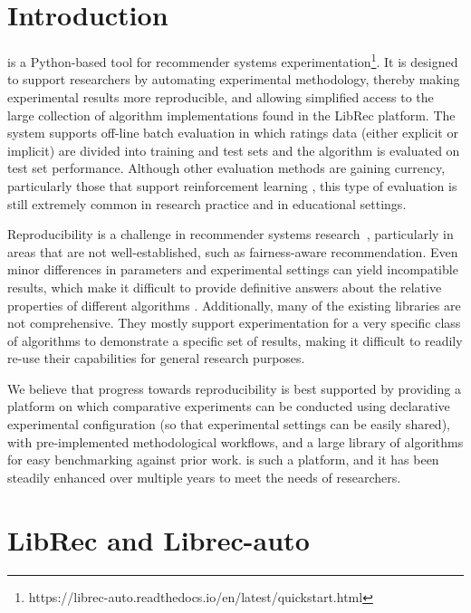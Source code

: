 \section{Introduction}
\label{sec:librec_intro}

\libauto{} is a Python-based tool for recommender systems experimentation\footnote{https://librec-auto.readthedocs.io/en/latest/quickstart.html}. It is designed to support researchers by automating experimental methodology, thereby making experimental results more reproducible, and allowing simplified access to the large collection of algorithm implementations found in the LibRec platform. The system supports off-line batch evaluation in which ratings data (either explicit or implicit) are divided into training and test sets and the algorithm is evaluated on test set performance. Although other evaluation methods are gaining currency, particularly those that support reinforcement learning \cite{joachims2018reveal,joachims2019reveal,joachims2020reveal}, this type of evaluation is still extremely common in research practice and in educational settings. 

Reproducibility is a challenge in recommender systems research~\cite{said2014comparative,beel2016towards,sun2020we}, particularly in areas that are not well-established, such as fairness-aware recommendation. Even minor differences in parameters and experimental settings can yield incompatible results, which make it difficult to provide definitive answers about the relative properties of different algorithms \cite{Said2015Replicable}. Additionally, many of the existing libraries are not comprehensive. They mostly support experimentation for a very specific class of algorithms to demonstrate a specific set of results, making it difficult to readily re-use their capabilities for general research purposes. 

We believe that progress towards reproducibility is best supported by providing a platform on which comparative experiments can be conducted using declarative experimental configuration (so that experimental settings can be easily shared), with pre-implemented methodological workflows, and a large library of algorithms for easy benchmarking against prior work. \libauto{} is such a platform, and it has been steadily enhanced over multiple years to meet the needs of researchers.


\section{LibRec and Librec-auto}
\label{sec:libauto}

